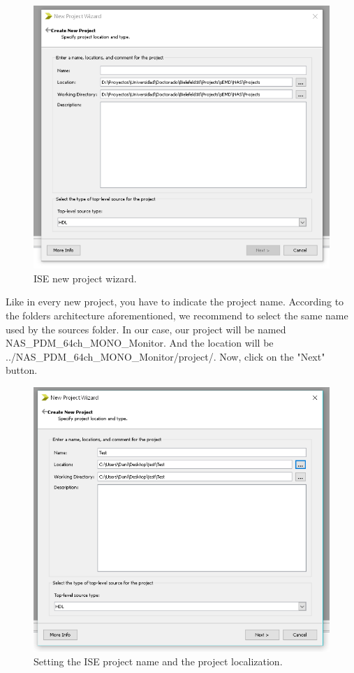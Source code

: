 \begin{figure}[H]
\centering
\includegraphics[width=1\textwidth]{images/Img29_NewProject_Wizard.PNG}
\caption{\label{fig:ISE_project_wizard}ISE new project wizard.}
\end{figure}

Like in every new project, you have to indicate the project name. According to the folders architecture aforementioned, we recommend to select the same name used by the sources folder. In our case, our project will be named NAS\_PDM\_64ch\_MONO\_Monitor. And the location will be ../NAS\_PDM\_64ch\_MONO\_Monitor/project/. Now, click on the "Next" button.

\begin{figure}[H]
\centering
\includegraphics[width=1\textwidth]{images/Img30_NewProject_Wizard_bis.PNG}
\caption{\label{fig:ISE_name_location_project}Setting the ISE project name and the project localization.}
\end{figure}

